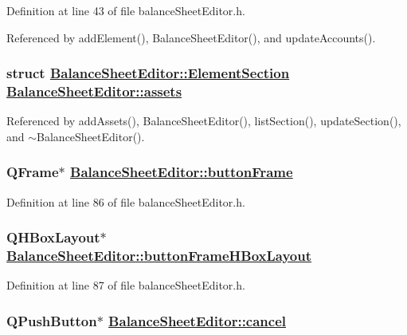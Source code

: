 Definition at line 43 of file balance\-Sheet\-Editor.h.

Referenced by add\-Element(), Balance\-Sheet\-Editor(), and update\-Accounts().\hypertarget{classBalanceSheetEditor_r4}{
\subsubsection[assets]{\setlength{\rightskip}{0pt plus 5cm}struct \hyperlink{structBalanceSheetEditor_1_1ElementSection}{Balance\-Sheet\-Editor::Element\-Section}  \hyperlink{classBalanceSheetEditor_r4}{Balance\-Sheet\-Editor::assets}}}
\label{classBalanceSheetEditor_r4}




Referenced by add\-Assets(), Balance\-Sheet\-Editor(), list\-Section(), update\-Section(), and $\sim$Balance\-Sheet\-Editor().\hypertarget{classBalanceSheetEditor_r29}{
\subsubsection[buttonFrame]{\setlength{\rightskip}{0pt plus 5cm}QFrame$\ast$ \hyperlink{classBalanceSheetEditor_r29}{Balance\-Sheet\-Editor::button\-Frame}}}
\label{classBalanceSheetEditor_r29}


Definition at line 86 of file balance\-Sheet\-Editor.h.\hypertarget{classBalanceSheetEditor_r30}{
\subsubsection[buttonFrameHBoxLayout]{\setlength{\rightskip}{0pt plus 5cm}QHBox\-Layout$\ast$ \hyperlink{classBalanceSheetEditor_r30}{Balance\-Sheet\-Editor::button\-Frame\-HBox\-Layout}}}
\label{classBalanceSheetEditor_r30}


Definition at line 87 of file balance\-Sheet\-Editor.h.\hypertarget{classBalanceSheetEditor_r32}{
\subsubsection[cancel]{\setlength{\rightskip}{0pt plus 5cm}QPush\-Button$\ast$ \hyperlink{classBalanceSheetEditor_r32}{Balance\-Sheet\-Editor::cancel}}}
\label{classBalanceSheetEditor_r32}


